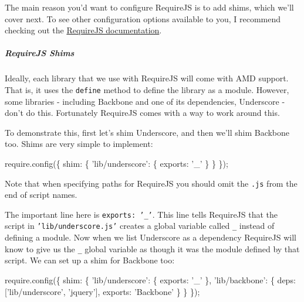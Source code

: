\documentclass[9pt]{book}
\newenvironment{Shaded}{}{}
\newcommand{\DataTypeTok}[1]{\textcolor[rgb]{0.56,0.13,0.00}{{#1}}}
\newcommand{\StringTok}[1]{\textcolor[rgb]{0.25,0.44,0.63}{{#1}}}
\newcommand{\OtherTok}[1]{\textcolor[rgb]{0.00,0.44,0.13}{{#1}}}
\newcommand{\FunctionTok}[1]{\textcolor[rgb]{0.02,0.16,0.49}{{#1}}}
\newcommand{\NormalTok}[1]{{#1}}
\begin{document}
The main reason you'd want to configure RequireJS is to add shims, which
we'll cover next. To see other configuration options available to you, I
recommend checking out the
\href{http://requirejs.org/docs/api.html\#config}{RequireJS
documentation}.

\subparagraph{RequireJS Shims}\label{requirejs-shims}

Ideally, each library that we use with RequireJS will come with AMD
support. That is, it uses the \texttt{define} method to define the
library as a module. However, some libraries - including Backbone and
one of its dependencies, Underscore - don't do this. Fortunately
RequireJS comes with a way to work around this.

To demonstrate this, first let's shim Underscore, and then we'll shim
Backbone too. Shims are very simple to implement:

\begin{Shaded}
\begin{Highlighting}[]
\OtherTok{require}\NormalTok{.}\FunctionTok{config}\NormalTok{(\{}
    \DataTypeTok{shim}\NormalTok{: \{}
        \StringTok{'lib/underscore'}\NormalTok{: \{}
            \DataTypeTok{exports}\NormalTok{: }\StringTok{'_'}
        \NormalTok{\}}
    \NormalTok{\}}
\NormalTok{\});}
\end{Highlighting}
\end{Shaded}

Note that when specifying paths for RequireJS you should omit the
\texttt{.js} from the end of script names.

The important line here is \texttt{exports: '\_'}. This line tells
RequireJS that the script in \texttt{'lib/underscore.js'} creates a
global variable called \texttt{\_} instead of defining a module. Now
when we list Underscore as a dependency RequireJS will know to give us
the \texttt{\_} global variable as though it was the module defined by
that script. We can set up a shim for Backbone too:

\begin{Shaded}
\begin{Highlighting}[]
\OtherTok{require}\NormalTok{.}\FunctionTok{config}\NormalTok{(\{}
    \DataTypeTok{shim}\NormalTok{: \{}
        \StringTok{'lib/underscore'}\NormalTok{: \{}
          \DataTypeTok{exports}\NormalTok{: }\StringTok{'_'}
        \NormalTok{\},}
        \StringTok{'lib/backbone'}\NormalTok{: \{}
            \DataTypeTok{deps}\NormalTok{: [}\StringTok{'lib/underscore'}\NormalTok{, }\StringTok{'jquery'}\NormalTok{],}
            \DataTypeTok{exports}\NormalTok{: }\StringTok{'Backbone'}
        \NormalTok{\}}
    \NormalTok{\}}
\NormalTok{\});}
\end{Highlighting}
\end{Shaded}
\end{document}
